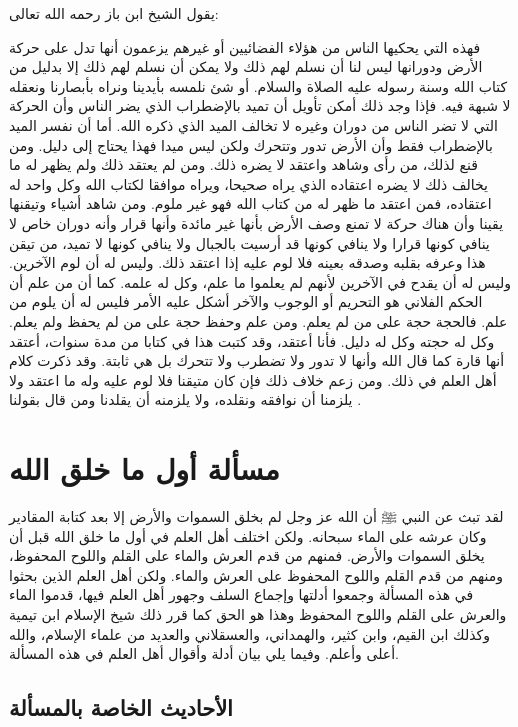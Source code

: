يقول الشيخ ابن باز رحمه الله تعالى:

فهذه التي يحكيها الناس من هؤلاء الفضائيين أو غيرهم يزعمون أنها تدل على حركة الأرض ودورانها ليس لنا أن نسلم لهم ذلك ولا يمكن أن نسلم لهم ذلك إلا بدليل من كتاب الله وسنة رسوله عليه الصلاة والسلام. أو شئ نلمسه بأيدينا ونراه بأبصارنا ونعقله لا شبهة فيه. فإذا وجد  ذلك أمكن تأويل أن تميد بالإضطراب الذي يضر الناس وأن الحركة التي لا تضر الناس من دوران وغيره لا تخالف الميد الذي ذكره الله. أما أن نفسر الميد بالإضطراب فقط وأن الأرض تدور وتتحرك ولكن ليس ميدا فهذا يحتاج إلى دليل. ومن قنع لذلك، من رأى وشاهد واعتقد لا يضره ذلك. ومن لم يعتقد ذلك ولم يظهر له ما يخالف ذلك لا يضره اعتقاده الذي يراه صحيحا، ويراه موافقا لكتاب الله وكل واحد له اعتقاده، فمن اعتقد ما ظهر له من كتاب الله فهو غير ملوم. ومن شاهد أشياء وتيقنها يقينا وأن هناك حركة لا تمنع وصف الأرض بأنها غير مائدة وأنها قرار وأنه دوران خاص لا ينافي كونها قرارا ولا ينافي كونها قد أرسيت بالجبال ولا ينافي كونها لا تميد، من تيقن هذا وعرفه بقلبه وصدقه بعينه فلا لوم عليه إذا اعتقد ذلك. وليس له أن لوم الآخرين. وليس له أن يقدح في الآخرين لأنهم لم يعلموا ما علم، وكل له علمه. كما أن من علم أن الحكم الفلاني هو التحريم أو الوجوب والآخر أشكل عليه الأمر فليس له أن يلوم من علم. فالحجة حجة على من لم يعلم. ومن علم وحفظ حجة على من لم يحفظ ولم يعلم. وكل له حجته وكل له دليل. فأنا أعتقد، وقد كتبت هذا في كتابا من مدة سنوات، أعتقد أنها قارة كما قال الله وأنها لا تدور ولا تضطرب ولا تتحرك بل هي ثابتة. وقد ذكرت كلام أهل العلم في ذلك. ومن زعم خلاف ذلك فإن كان متيقنا فلا لوم عليه وله ما اعتقد ولا يلزمنا أن نوافقه ونقلده، ولا يلزمنه أن يقلدنا ومن قال بقولنا \href{https://www.youtube.com/watch?v=nbzh7p2ZlFQ}{\faExternalLink}. 


\section{مسألة أول ما خلق الله}
\label{sec:app_first_creation}


لقد تبث عن النبي ﷺ أن الله عز وجل لم بخلق السموات والأرض إلا بعد كتابة المقادير وكان عرشه على الماء سبحانه. ولكن اختلف أهل العلم في أول ما خلق الله قبل أن يخلق السموات والأرض. فمنهم من قدم العرش والماء على القلم واللوح المحفوظ، ومنهم من قدم القلم واللوح المحفوظ على العرش والماء. ولكن أهل العلم الذين بحثوا في هذه المسألة وجمعوا أدلتها وإجماع السلف وجهور أهل العلم فيها، قدموا الماء والعرش على القلم واللوح المحفوظ وهذا هو الحق كما قرر ذلك شيخ الإسلام ابن تيمية وكذلك ابن القيم، وابن كثير، والهمداني، والعسقلاني والعديد من علماء الإسلام، والله أعلى وأعلم. وفيما يلي بيان أدلة وأقوال أهل العلم في هذه المسألة.

\subsection{الأحاديث الخاصة بالمسألة}

